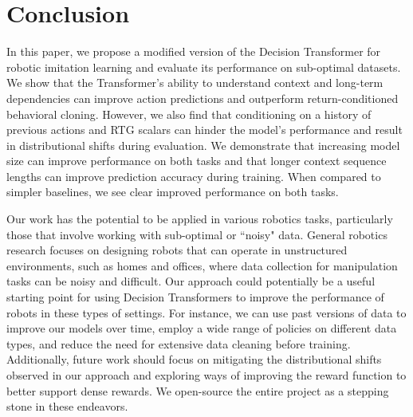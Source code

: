 

\section{Conclusion}

In this paper, we propose a modified version of the Decision Transformer for robotic imitation learning and evaluate its performance on sub-optimal datasets. We show that the Transformer's ability to understand context and long-term dependencies can improve action predictions and outperform return-conditioned behavioral cloning. However, we also find that conditioning on a history of previous actions and RTG scalars can hinder the model's performance and result in distributional shifts during evaluation. We demonstrate that increasing model size can improve performance on both tasks and that longer context sequence lengths can improve prediction accuracy during training. When compared to simpler baselines, we see clear improved performance on both tasks.

Our work has the potential to be applied in various robotics tasks, particularly those that involve working with sub-optimal or ``noisy" data. General robotics research focuses on designing robots that can operate in unstructured environments, such as homes and offices, where data collection for manipulation tasks can be noisy and difficult. Our approach could potentially be a useful starting point for using Decision Transformers to improve the performance of robots in these types of settings. For instance, we can use past versions of data to improve our models over time, employ a wide range of policies on different data types, and reduce the need for extensive data cleaning before training. Additionally, future work should focus on mitigating the distributional shifts observed in our approach and exploring ways of improving the reward function to better support dense rewards. We open-source the entire project as a stepping stone in these endeavors. 
